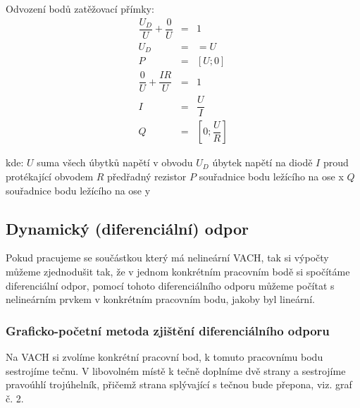   	Odvození bodů zatěžovací přímky:
  	\begin{eqnarray}
      \dfrac{U_D}{U} + \dfrac{0}{U} &=& 1 \nonumber\\
      U_D &=& = U \nonumber\\
      P &=& [U; 0] \\      
      \dfrac{0}{U} + \dfrac{IR}{U} &=& 1 \nonumber\\
      I &=& \dfrac{U}{I} \nonumber\\
      Q &=& \left[0; \dfrac{U}{R}\right]
    \end{eqnarray}
    		  
		\hspace*{2cm}kde:\newline    
		\hspace*{4cm}$U$ \dotfill suma všech úbytků napětí v obvodu\hspace*{4cm}\newline
		\hspace*{4cm}$U_D$ \dotfill úbytek napětí na diodě\hspace*{4cm}\newline
		\hspace*{4cm}$I$ \dotfill proud protékající obvodem\hspace*{4cm}\newline
		\hspace*{4cm}$R$ \dotfill předřadný rezistor\hspace*{4cm}\newline		
		\hspace*{4cm}$P$ \dotfill souřadnice bodu ležícího na ose x\hspace*{4cm}\newline
  	\hspace*{4cm}$Q$ \dotfill souřadnice bodu ležícího na ose y\hspace*{4cm}\newline
  	
  \subsection{Dynamický (diferenciální) odpor}
  	\indent\indent
  	Pokud pracujeme se součástkou který má nelineární VACH, tak si výpočty můžeme zjednodušit tak, že v jednom konkrétním pracovním bodě si spočítáme diferenciální odpor, pomocí tohoto diferenciálního odporu můžeme počítat s nelineárním prvkem v konkrétním pracovním bodu, jakoby byl lineární.
  	
  	\subsubsection{Graficko-početní metoda zjištění diferenciálního odporu}
  		\indent\indent
  		Na VACH si zvolíme konkrétní pracovní bod, k tomuto pracovnímu bodu sestrojíme tečnu. V libovolném místě k tečně doplníme dvě strany a sestrojíme pravoúhlí trojúhelník, přičemž strana splývající s tečnou bude přepona, viz. graf č. 2.
  		

